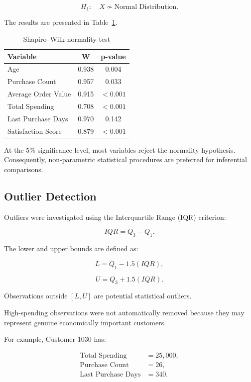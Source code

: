 \documentclass[11pt,a4paper]{article}
\newcommand{\Halt}{H_{1}}
\begin{document}
\[
\Halt:\quad X \not\sim \text{Normal Distribution}.
\]

The results are presented in Table~\ref{tab:normality_detailed}.

\begin{table}[H]
\centering
\caption{Shapiro--Wilk normality test}
\label{tab:normality_detailed}
\begin{tabular}{lcc}
\toprule
\textbf{Variable} & \textbf{W} & \textbf{p-value}\\
\midrule
Age & 0.938 & 0.004\\
Purchase Count & 0.957 & 0.033\\
Average Order Value & 0.915 & $<0.001$\\
Total Spending & 0.708 & $<0.001$\\
Last Purchase Days & 0.970 & 0.142\\
Satisfaction Score & 0.879 & $<0.001$\\
\bottomrule
\end{tabular}
\end{table}

At the 5\% significance level, most variables reject the normality hypothesis. Consequently, non-parametric statistical procedures are preferred for inferential comparisons.

\subsection{Outlier Detection}

Outliers were investigated using the Interquartile Range (IQR) criterion:

\[
IQR=Q_3-Q_1.
\]

The lower and upper bounds are defined as:

\[
L=Q_1-1.5(IQR),
\]

\[
U=Q_3+1.5(IQR).
\]

Observations outside $[L,U]$ are potential statistical outliers.

High-spending observations were not automatically removed because they may represent genuine economically important customers.

For example, Customer 1030 has:

\begin{align}
\text{Total Spending} &= 25,000,\\
\text{Purchase Count} &= 26,\\
\text{Last Purchase Days} &= 340.
\end{align}
\end{document}
